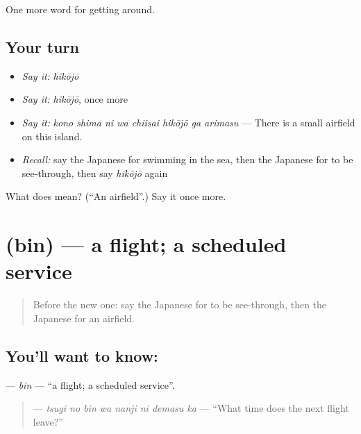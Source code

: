 \begin{grammarlens}[title={What you've built}]
One more word for getting around.
\end{grammarlens}

\subsection*{Your turn}
\begin{itemize}
\raggedright
  \item \emph{Say it:} \emph{hikōjō}
  \item \emph{Say it:} \emph{hikōjō}, once more
  \item \emph{Say it:} \emph{kono shima ni wa chiisai hikōjō ga arimasu} — There is a small airfield on this island.
  \item \emph{Recall:} say the Japanese for swimming in the sea, then the Japanese for to be see-through, then say \emph{hikōjō} again
\end{itemize}

\begin{tcolorbox}[breakable,colback=teal!4,colframe=teal!35!black,title={Before you move on}]
What does  mean? (\textquotedblleft{}An airfield\textquotedblright{}.) Say it once more.
\end{tcolorbox}
\section[\texorpdfstring{\ja{びん} (bin)}{びん (bin)}]{ (bin) — a flight; a scheduled service}

\label{lesson:JA-C384-bin}



\begin{quote}
Before the new one: say the Japanese for to be see-through, then the Japanese for an airfield.
\end{quote}

\subsection*{You'll want to know: }
\textbf{} — \emph{bin} — \textquotedblleft{}a flight; a scheduled service\textquotedblright{}.

\begin{quote}
\textbf{   } — \emph{tsugi no bin wa nanji ni demasu ka} — \textquotedblleft{}What time does the next flight leave?\textquotedblright{}
\end{quote}

